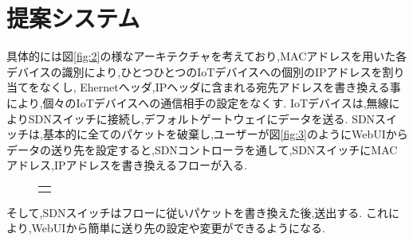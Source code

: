 \documentclass{jsarticle}
\begin{document}
\section{提案システム}
	具体的には図\ref{fig:2}の様なアーキテクチャを考えており,MACアドレスを用いた各デバイスの識別により,ひとつひとつのIoTデバイスへの個別のIPアドレスを割り当てをなくし,
	Ehernetヘッダ,IPヘッダに含まれる宛先アドレスを書き換える事により,個々のIoTデバイスへの通信相手の設定をなくす.
	IoTデバイスは,無線によりSDNスイッチに接続し,デフォルトゲートウェイにデータを送る.
	SDNスイッチは,基本的に全てのパケットを破棄し,ユーザーが図\ref{fig:3}のようにWebUIからデータの送り先を設定すると,SDNコントローラを通して,SDNスイッチにMACアドレス,IPアドレスを書き換えるフローが入る.
	\begin{figure}[htbp]
		\begin{center}
			\begin{tabular}{c}
				\begin{minipage}{0.5\hsize}
					\begin{center}
						\includegraphics*[0,0][125,60]{shiryou2.png}
						\caption{\label{fig:2}}
					\end{center}
				\end{minipage}
				\begin{minipage}{0.5\hsize}
					\begin{center}
						\includegraphics*[0,0][200,70]{shiryou3.png}
						\caption{\label{fig:3}}
					\end{center}
				\end{minipage}
			\end{tabular}
		\end{center}
	\end{figure}
	そして,SDNスイッチはフローに従いパケットを書き換えた後,送出する.
	これにより,WebUIから簡単に送り先の設定や変更ができるようになる.
\end{document}
